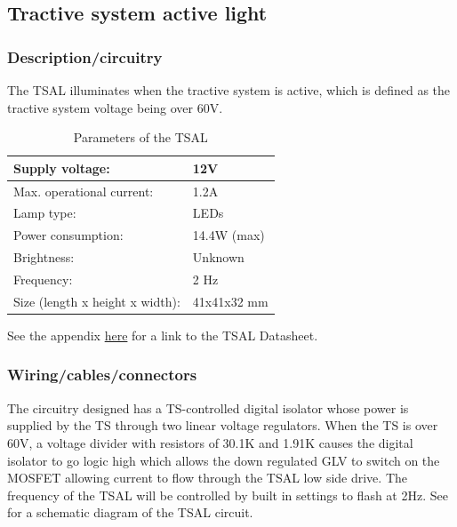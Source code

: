 \documentclass{article}
\begin{document}
\subsection{Tractive system active light}\label{tractive_system_active_light}
\subsubsection{Description/circuitry}
The TSAL illuminates when the tractive system is active, which is defined as the tractive system voltage being over 60V.

	\begin{table}[H]
	    \centering
	    \begin{tabular}{|l|l|}
	    \hline
	    Supply voltage: & 12V \\ \hline
	    Max. operational current: &  1.2A\\ \hline
	    Lamp type: & LEDs \\ \hline
	    Power consumption: & 14.4W (max)\\ \hline
	    Brightness: & Unknown\\ \hline
	    Frequency: & 2 Hz \\ \hline
	    Size (length x height x width): & 41x41x32 mm \\ \hline
	    \end{tabular}
	    \caption{Parameters of the TSAL}
	    \label{TSALparameters}
	\end{table}
	
See the appendix \hyperlink{TSALdatasheet}{here} for a link to the TSAL Datasheet.

\subsubsection{Wiring/cables/connectors}
The circuitry designed has a TS-controlled digital isolator whose power is supplied by the TS through two linear voltage regulators. When the TS is over 60V, a voltage divider with resistors of 30.1K and 1.91K causes the digital isolator to go logic high which allows the down regulated GLV to switch on the MOSFET allowing current to flow through the TSAL low side drive. The frequency of the TSAL will be controlled by built in settings to flash at 2Hz. See  for a schematic diagram of the TSAL circuit.
\end{document}
